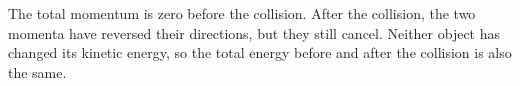 The total momentum is zero before the collision. After the
collision, the two momenta have reversed their directions, but they still cancel.
Neither object has changed its kinetic energy, so the total energy before and after the collision
is also the same.



